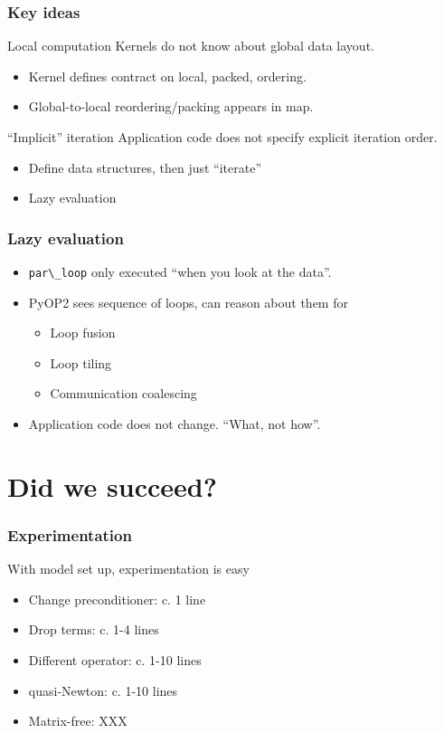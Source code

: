 \documentclass[presentation]{beamer}
\begin{document}
\begin{frame}
  \frametitle{Key ideas}
  \begin{block}{Local computation}
    Kernels do not know about global data layout.
    \begin{itemize}
    \item Kernel defines contract on local, packed, ordering.
    \item Global-to-local reordering/packing appears in map.
    \end{itemize}
  \end{block}
  \begin{block}{``Implicit'' iteration}
    Application code does not specify explicit iteration order.
    \begin{itemize}
    \item Define data structures, then just ``iterate''
    \item Lazy evaluation
    \end{itemize}
  \end{block}
\end{frame}

\begin{frame}
  \frametitle{Lazy evaluation}
    \begin{itemize}
    \item \verb~par\_loop~ only executed ``when you look at the
      data''.
    \item PyOP2 sees sequence of loops, can reason about them for
      \begin{itemize}
      \item Loop fusion
      \item Loop tiling
      \item Communication coalescing
      \end{itemize}
    \item Application code does not change.  ``What, not how''.
    \end{itemize}
\end{frame}

\section{Did we succeed?}

\begin{frame}
  \frametitle{Experimentation}
  
  With model set up, experimentation is easy

  \begin{itemize}
  \item Change preconditioner: c. 1 line
  \item Drop terms: c. 1-4 lines
  \item Different operator: c. 1-10 lines
  \item quasi-Newton: c. 1-10 lines
  \item Matrix-free: XXX
  \end{itemize}
\end{frame}
\end{document}
